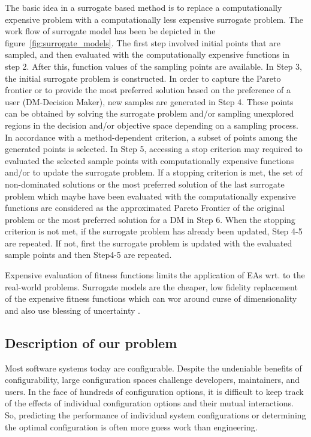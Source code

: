 \documentclass{newsig}
\begin{document}
The basic idea in a surrogate based method is to replace a computationally expensive problem with a computationally less expensive surrogate problem. The work flow of surrogate model has been be depicted in the figure~\ref{fig:surrogate_models}. 
The first step involved initial points that are sampled, and then evaluated with the computationally expensive functions in step 2. After this, function values of the sampling points are available. In Step 3, the initial surrogate problem is constructed. In order to capture the Pareto frontier or to provide the most preferred solution based on the preference of a user (DM-Decision Maker), new samples are generated in Step 4. These points can be obtained by solving the surrogate problem and/or sampling unexplored regions in the decision and/or objective space depending on a sampling process. In accordance with a method-dependent criterion, a subset of points among the generated points is selected. In Step 5, accessing a stop criterion may required to evaluated the selected sample points with computationally expensive functions and/or to update the surrogate problem. If a stopping criterion is met, the set of non-dominated solutions or the most preferred solution of the last surrogate problem which maybe have been evaluated with the computationally  expensive functions are considered as the approximated Pareto Frontier of the original problem or the most preferred solution for a DM in Step 6. When the stopping criterion is not met, if the surrogate problem has already been updated, Step 4-5 are repeated. If not, first the surrogate problem is updated with the evaluated sample points and then Step4-5 are repeated. 

\begin{myshadowbox}
Expensive evaluation of fitness functions limits the application of EAs wrt. to the real-world problems. Surrogate models are the cheaper, low fidelity replacement of the expensive fitness functions which can wor around \textquotesingle curse of dimensionality \textquotesingle and also use \textquotesingle blessing of uncertainty \textquotesingle.
\end{myshadowbox}
 
 
 \subsection{Description of our problem}\label{section:problem_statement}
 Most software systems today are configurable. Despite the undeniable benefits
of configurability, 
large configuration spaces challenge developers, maintainers, and users. In the face of hundreds of configuration options, it is difficult to keep track of the effects of individual configuration options and their mutual interactions. So, predicting the performance of individual system configurations or determining the optimal configuration is often more guess work than engineering. 
\end{document}
